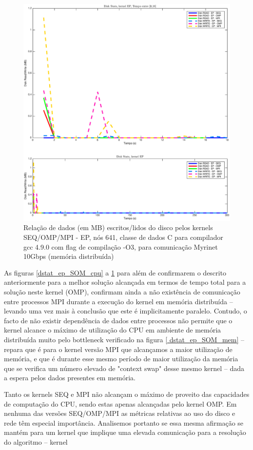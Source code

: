 \documentclass[conference,compsoc]{IEEEtran}
\begin{document}
\begin{figure}[H]
\centering
\includegraphics[width=1.1\columnwidth]{EPS/dstat_EP_seq_vs_omp_vs_mpi/disk.eps}
\caption{Relação de dados (em MB) escritos/lidos do disco pelos kernels SEQ/OMP/MPI - EP, nós 641, classe de dados C para compilador gcc 4.9.0 com flag de compilação  -O3, para comunicação Myrinet 10Gbps (memória distribuída)}
\label{dstat_ep_SOM_disk}
\end{figure}



As figuras \ref{dstat_ep_SOM_cpu} a \ref{dstat_ep_SOM_disk} para além de confirmarem o descrito anteriormente para a melhor solução alcançada em termos de tempo total para a solução neste kernel (OMP),  confirmam ainda a não existência de comunicação entre processos MPI durante a execução do kernel em memória distribuída -- levando uma vez mais à conclusão que este é implicitamente paralelo. Contudo, o facto de não existir dependência de dados entre processos não permite que o kernel alcance o máximo de utilização do CPU em ambiente de memória distribuída muito pelo bottleneck verificado na figura \ref{ dstat_ep_SOM_mem} -- repara que é para o kernel versão MPI que alcançamos a maior utilização de memória, e que é durante esse mesmo período de maior utilização da memória que se verifica um número elevado de "context swap" desse mesmo kernel -- dada a espera pelos dados presentes em memória.\par 
Tanto os kernels SEQ e MPI não alcançam o máximo de proveito das capacidades de computação do CPU, sendo estas apenas alcançadas pelo kernel OMP. Em nenhuma das versões SEQ/OMP/MPI as métricas relativas ao uso do disco e rede têm especial importância. Analisemos portanto se essa mesma afirmação se mantém para um kernel que implique uma elevada comunicação para a resolução do algoritmo -- kernel 
\end{document}
